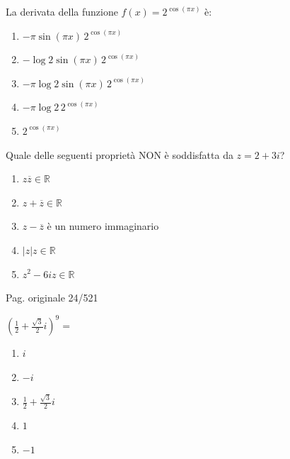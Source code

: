 \begin{quiz}
La derivata della funzione $f(x)=2^{\cos(\pi x)}$ \`e:
\begin{enumerate}[label=\alph*),leftmargin=1.3cm,itemsep=3pt,topsep=5pt]
\item $-\pi\sin(\pi x)\,2^{\cos(\pi x)}$
\item $-\log2\sin(\pi x)\,2^{\cos(\pi x)}$
\item $-\pi\log2\sin(\pi x)\,2^{\cos(\pi x)}$
\item $-\pi\log2\,2^{\cos(\pi x)}$
\item $2^{\cos(\pi x)}$
\end{enumerate}
\end{quiz}

\begin{quiz}
Quale delle seguenti propriet\`a NON \`e soddisfatta da $z=2+3i$?
\begin{enumerate}[label=\alph*),leftmargin=1.3cm,itemsep=3pt,topsep=5pt]
\item $z\overline z\in\mathbb R$
\item $z+\overline z\in\mathbb R$
\item $z-\overline z$ \`e un numero immaginario
\item $|z|z\in\mathbb R$
\item $z^2-6iz\in\mathbb R$
\end{enumerate}
\end{quiz}

\par\noindent\hfill{\color{cyan!65!black}\scriptsize Pag. originale 24/521}\par\smallskip

\begin{quiz}
$\left(\frac12+\frac{\sqrt3}{2}i\right)^9=$
\begin{enumerate}[label=\alph*),leftmargin=1.3cm,itemsep=3pt,topsep=5pt]
\item $i$
\item $-i$
\item $\frac12+\frac{\sqrt3}2i$
\item $1$
\item $-1$
\end{enumerate}
\end{quiz}

